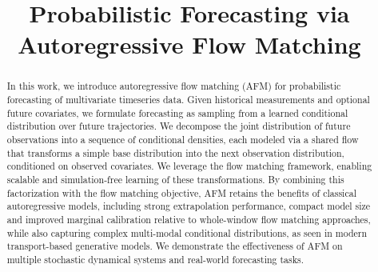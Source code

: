 \documentclass[preprint,12pt,authoryear]{elsarticle}
\newcommand{\oldrev}[1]{#1}
\begin{document}
\begin{frontmatter}



\title{Probabilistic Forecasting via Autoregressive Flow Matching} %




\begin{abstract}
In this work, we introduce autoregressive flow matching (AFM) for probabilistic forecasting of multivariate timeseries data. Given historical measurements and optional future covariates, we formulate forecasting as sampling from a learned conditional distribution over future trajectories. We decompose the joint distribution of future observations into a sequence of conditional densities, each modeled via a shared flow that transforms a simple base distribution into the next observation distribution, conditioned on observed covariates. We leverage the flow matching framework, enabling scalable and simulation-free learning of these transformations.
By combining this factorization with the flow matching objective, AFM retains the benefits of classical autoregressive models, including strong extrapolation performance, compact model size and \oldrev{improved marginal calibration relative to whole-window flow matching approaches}, while also capturing complex multi-modal conditional distributions, as seen in modern transport-based generative models. We demonstrate the effectiveness of AFM on multiple stochastic dynamical systems and real-world forecasting tasks.
\end{abstract}


\end{frontmatter}
\end{document}
